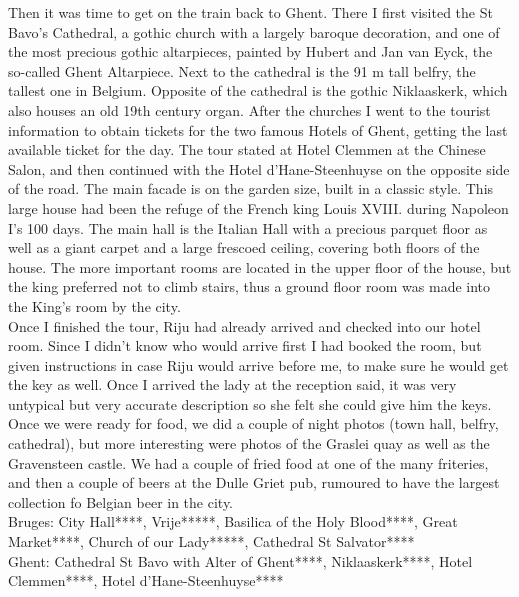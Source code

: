  Then it was time to get on the train back to Ghent. There I first visited the St Bavo's Cathedral, a gothic church with a largely baroque decoration, and one of the most precious gothic altarpieces, painted by Hubert and Jan van Eyck, the so-called Ghent Altarpiece. Next to the cathedral is the 91 m tall belfry, the tallest one in Belgium. Opposite of the cathedral is the gothic Niklaaskerk, which also houses an old 19th century organ. After the churches I went to the tourist information to obtain tickets for the two famous Hotels of Ghent, getting the last available ticket for the day. The tour stated at Hotel Clemmen at the Chinese Salon, and then continued with the Hotel d'Hane-Steenhuyse on the opposite side of the road. The main facade is on the garden size, built in a classic style. This large house had been the refuge of the French king Louis XVIII. during Napoleon I's 100 days. The main hall is the Italian Hall with a precious parquet floor as well as a giant carpet and a large frescoed ceiling, covering both floors of the house. The more important rooms are located in the upper floor of the house, but the king preferred not to climb stairs, thus a ground floor room was made into the King's room by the city.\\
 Once I finished the tour, Riju had already arrived and checked into our hotel room. Since I didn't know who would arrive first I had booked the room, but given instructions in case Riju would arrive before me, to make sure he would get the key as well. Once I arrived the lady at the reception said, it was very untypical but very accurate description so she felt she could give him the keys. Once we were ready for food, we did a couple of night photos (town hall, belfry, cathedral), but more interesting were photos of the Graslei quay as well as the Gravensteen castle. We had a couple of fried food at one of the many friteries, and then a couple of beers at the Dulle Griet pub, rumoured to have the largest collection fo Belgian beer in the city.\\

Bruges: City Hall****, Vrije*****, Basilica of the Holy Blood****, Great Market****, Church of our Lady*****, Cathedral St Salvator****\\
Ghent: Cathedral St Bavo with Alter of Ghent****, Niklaaskerk****, Hotel Clemmen****, Hotel d'Hane-Steenhuyse****\\

